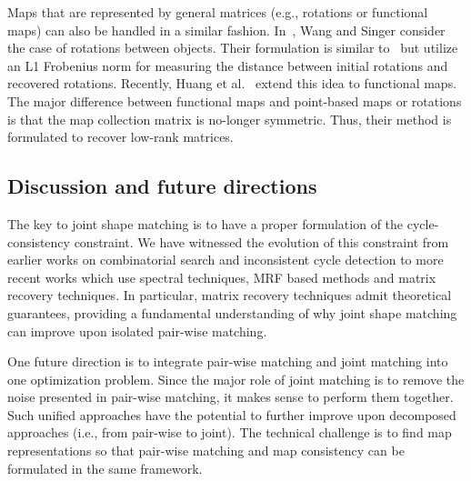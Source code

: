  Maps that are represented by general matrices (e.g., rotations or functional maps) can also be handled in a similar fashion. In~\cite{journals/corr/abs-1211-2441}, Wang and Singer consider the case of rotations between objects. Their formulation is similar to~\cite{Huang:2013:SDP} but utilize an L1 Frobenius norm for measuring the distance between initial rotations and recovered rotations. Recently, Huang et al.~\cite{Huang:2014:FMN} extend this idea to functional maps. The major difference between functional maps and point-based maps or rotations is that the map collection matrix is no-longer symmetric. Thus, their method is formulated to recover low-rank matrices.


\subsection{Discussion and future directions}

The key to joint shape matching is to have a proper formulation of the cycle-consistency constraint. We have witnessed the evolution of this constraint from earlier works on combinatorial search and inconsistent cycle detection to more recent works which use spectral techniques, MRF based methods and matrix recovery techniques. In particular, matrix recovery techniques admit theoretical guarantees, providing a fundamental understanding of why joint shape matching can improve upon isolated pair-wise matching.

One future direction is to integrate pair-wise matching and joint matching into one optimization problem. Since the major role of joint matching is to remove the noise presented in pair-wise matching, it makes sense to perform them together. Such unified approaches have the potential to further improve upon decomposed approaches (i.e., from pair-wise to joint). The technical challenge is to find map representations so that pair-wise matching and map consistency can be formulated in the same framework.

